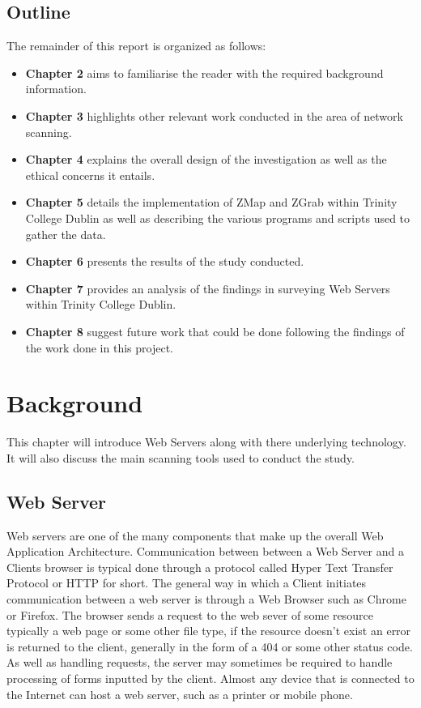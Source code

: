\documentclass[a4wide,leqno,12pt]{report}
\begin{document}
\section{Outline}
The remainder of this report is organized as follows:\\
\begin{itemize}
\item\textbf{Chapter 2} aims to familiarise the reader with the required background information.
\item\textbf{Chapter 3} highlights other relevant work conducted in the area of network scanning.
\item\textbf{Chapter 4} explains the overall design of the investigation as well as the ethical concerns it entails.
\item\textbf{Chapter 5} details the implementation of ZMap and ZGrab within Trinity College Dublin as well as describing the various programs and scripts used to gather the data.
\item\textbf{Chapter 6} presents the results of the study conducted.
\item\textbf{Chapter 7} provides an analysis of the findings in surveying Web Servers within Trinity College Dublin.
\item\textbf{Chapter 8} suggest future work that could be done following the findings of the work done in this project.
\end{itemize}


\chapter{Background}
This chapter will introduce Web Servers along with there underlying technology. It will also discuss the main scanning tools used to conduct the study.
\section{Web Server}

Web servers are one of the many components that make up the overall Web Application Architecture.
Communication between between a Web Server and a Clients browser is typical done through a protocol called Hyper Text Transfer Protocol or HTTP for short. The general way in which a Client initiates communication between a web server is through a Web Browser such as Chrome or Firefox. The browser sends a request to the web sever of some resource typically a web page or some other file type, if the resource doesn't exist an error is returned to the client, generally in the form of a 404 or some other status code. As well as handling requests, the server may sometimes be required to handle processing of forms inputted by the client\cite{conallen1999modeling}. Almost any device that is connected to the Internet can host a web server, such as a printer or mobile phone. \\
\end{document}
